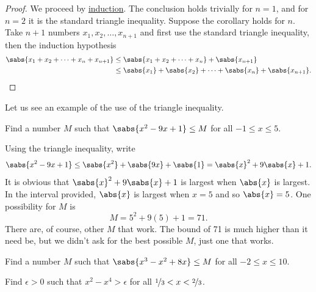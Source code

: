 \documentclass[12pt]{book}
\begin{document}
\begin{proof}
We proceed by \hyperref[induction:thm]{induction}.
The conclusion holds trivially for $n=1$, and
for $n=2$ it is the standard triangle inequality.
Suppose the corollary
holds for $n$.
Take $n+1$ numbers $x_1,x_2,\ldots,x_{n+1}$ and 
first use the standard triangle inequality, then the induction
hypothesis
\begin{equation*}
\begin{split}
\sabs{x_1 + x_2 + \cdots + x_n + x_{n+1}} & \leq 
\sabs{x_1 + x_2 + \cdots + x_n} + \sabs{x_{n+1}} \\
& \leq 
\sabs{x_1} + \sabs{x_2} + \cdots + \sabs{x_n} + \sabs{x_{n+1}} .  \qedhere
\end{split}
\end{equation*}
\end{proof}

Let us see an example of the use of the triangle inequality.

\begin{example}
Find a number $M$ such that $\sabs{x^2-9x+1} \leq M$ for all $-1 \leq x \leq
5$.

Using the triangle inequality, write
\begin{equation*}
\sabs{x^2-9x+1} \leq \sabs{x^2}+\sabs{9x}+\sabs{1}
=
\sabs{x}^2+9\sabs{x}+1 .
\end{equation*}
It is obvious that 
$\sabs{x}^2+9\sabs{x}+1$ is largest when $\abs{x}$ is largest.
In the interval
provided, $\abs{x}$ is largest when $x=5$ and so $\abs{x}=5$.
One
possibility for $M$ is
\begin{equation*}
M = 5^2+9(5)+1 = 71 .
\end{equation*}
There are, of course, other $M$ that work.
The bound of 71
is much higher than it
need be, but we didn't ask for the best possible $M$, just one that works.
\end{example}

\begin{exercise}
Find a number $M$ such that $\sabs{x^3-x^2+8x} \leq M$ for all $-2 \leq x \leq
10$.
\end{exercise}

\begin{exercise}
Find $\epsilon>0$ such that $x^2-x^4>\epsilon$ for all  $\nicefrac13<x<\nicefrac23$.
\end{exercise}





\end{document}
